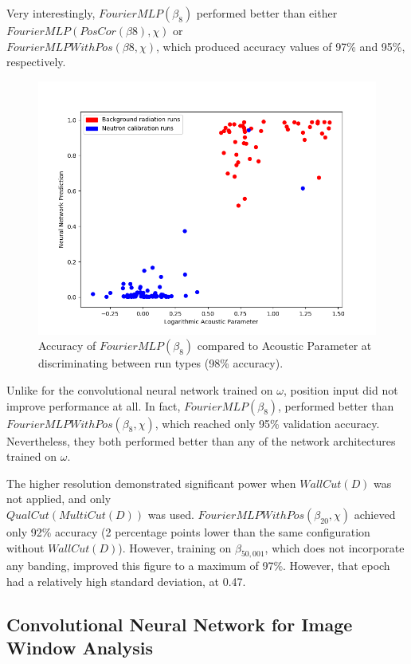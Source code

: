 \documentclass[10pt]{article}
\begin{document}
Very interestingly, $FourierMLP(\beta_{8})$ performed better than either $FourierMLP(PosCor(\beta{8}), \chi)$ or \\ $FourierMLPWithPos(\beta{8}, \chi)$, which produced accuracy values of 97\% and 95\%, respectively.

\begin{figure}[h]
    \centering
    \includegraphics[width=\textwidth]{fourier_mlp_no_correction}
    \caption{\label{fourier_mlp_no_correction} Accuracy of $FourierMLP(\beta_{8})$ compared to Acoustic Parameter at discriminating between run types (98\% accuracy).}
\end{figure}

Unlike for the convolutional neural network trained on $\omega$, position input did not improve performance at all. In fact, $FourierMLP(\beta_{8})$, performed better than $FourierMLPWithPos(\beta_{8}, \chi)$, which reached only 95\% validation accuracy. Nevertheless, they both performed better than any of the network architectures trained on $\omega$.

The higher resolution demonstrated significant power when $WallCut(D)$ was not applied, and only \\ $QualCut(MultiCut(D))$ was used. $FourierMLPWithPos(\beta_{20}, \chi)$ achieved only 92\% accuracy (2 percentage points lower than the same configuration without $WallCut(D)$). However, training on $\beta_{50,001}$, which does not incorporate any banding, improved this figure to a maximum of 97\%. However, that epoch had a relatively high standard deviation, at 0.47.

\subsection{Convolutional Neural Network for Image Window Analysis}
\end{document}
